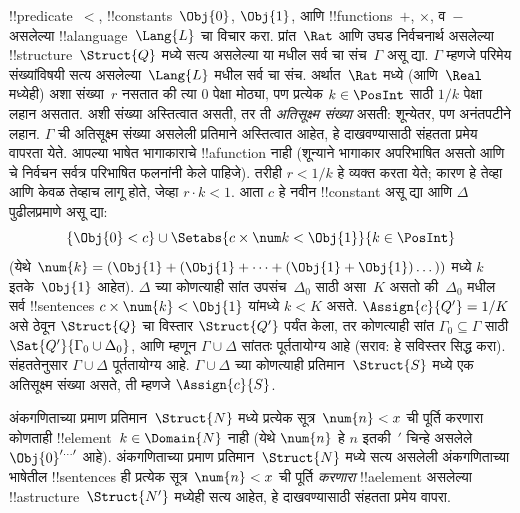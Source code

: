 \documentclass[../../../include/open-logic-section]{subfiles}
\begin{document}
{\begin{ex}
!!{predicate}~$<$, !!{constant}s~$\Obj{0}$, $\Obj{1}$, आणि
!!{function}s~$+$, $\times$, व~$-$ असलेल्या !!a{language}~$\Lang{L}$ चा
विचार करा. प्रांत~$\Rat$ आणि उघड निर्वचनार्थ असलेल्या
!!{structure}~$\Struct{Q}$ मध्ये सत्य असलेल्या या मधील सर्व
चा संच~$\Gamma$ असू द्या. $\Gamma$ म्हणजे परिमेय
संख्यांविषयी सत्य असलेल्या~$\Lang{L}$ मधील सर्व चा संच.
अर्थात~$\Rat$ मध्ये (आणि~$\Real$ मध्येही) अशा संख्या~$r$ नसतात की त्या
$0$ पेक्षा मोठ्या, पण प्रत्येक $k \in \PosInt$ साठी $1/k$ पेक्षा लहान
असतात. अशी संख्या अस्तित्वात असती, तर ती \emph{अतिसूक्ष्म संख्या} असती:
शून्येतर, पण अनंतपटीने लहान. $\Gamma$ ची अतिसूक्ष्म संख्या असलेली प्रतिमाने
अस्तित्वात आहेत, हे दाखवण्यासाठी संहतता प्रमेय वापरता येते. आपल्या भाषेत
भागाकाराचे !!a{function} नाही (शून्याने भागाकार अपरिभाषित असतो आणि
चे निर्वचन सर्वत्र परिभाषित फलनांनी केले पाहिजे). तरीही
$r < 1/k$ हे व्यक्त करता येते; कारण हे तेव्हा आणि केवळ तेव्हाच लागू होते,
जेव्हा $r \cdot k < 1$. आता $c$ हे नवीन !!{constant} असू द्या आणि
$\Delta$ पुढीलप्रमाणे असू द्या:
\[
\{\Obj{0} < c\}
\cup \Setabs{ c \times \num k < \Obj{1} }{k \in \PosInt}
\]
(येथे $\num{k} = (\Obj{1} + (\Obj{1} + \dots + (\Obj{1} +
\Obj{1})\dots))$ मध्ये $k$ इतके~$\Obj{1}$ आहेत). $\Delta$ च्या कोणत्याही
सांत उपसंच~$\Delta_0$ साठी असा~$K$ असतो की~$\Delta_0$ मधील सर्व
!!{sentence}s $c \times \num{k} < \Obj{1}$ यांमध्ये $k < K$ असते.
$\Assign{c}{Q'} = 1/K$ असे ठेवून $\Struct{Q}$ चा विस्तार
$\Struct{Q'}$ पर्यंत केला, तर कोणत्याही सांत $\Gamma_0 \subseteq \Gamma$
साठी $\Sat{Q'}{\Gamma_0 \cup \Delta_0}$, आणि म्हणून $\Gamma \cup \Delta$
सांततः पूर्ततायोग्य आहे (सराव: हे सविस्तर सिद्ध करा). संहततेनुसार
$\Gamma \cup \Delta$ पूर्ततायोग्य आहे. $\Gamma \cup \Delta$ च्या
कोणत्याही प्रतिमान~$\Struct{S}$ मध्ये एक अतिसूक्ष्म संख्या असते, ती म्हणजे
$\Assign{c}{S}$.
\end{ex}
}{}

\begin{prob}
अंकगणिताच्या प्रमाण प्रतिमान~$\Struct{N}$ मध्ये प्रत्येक सूत्र~$\num{n}
< x$ ची पूर्ति करणारा कोणताही !!{element}~$k \in \Domain{N}$ नाही
(येथे $\num{n}$ हे $n$ इतकी~$\prime$ चिन्हे असलेले
$\Obj{0}^{\prime\dots\prime}$ आहे). अंकगणिताच्या प्रमाण
प्रतिमान~$\Struct{N}$ मध्ये सत्य असलेली अंकगणिताच्या भाषेतील
!!{sentence}s ही प्रत्येक सूत्र~$\num{n} < x$ ची पूर्ति \emph{करणारा}
!!a{element} असलेल्या !!a{structure}~$\Struct{N'}$ मध्येही सत्य आहेत,
हे दाखवण्यासाठी संहतता प्रमेय वापरा.
\end{prob}
\tagendprob
\end{document}
